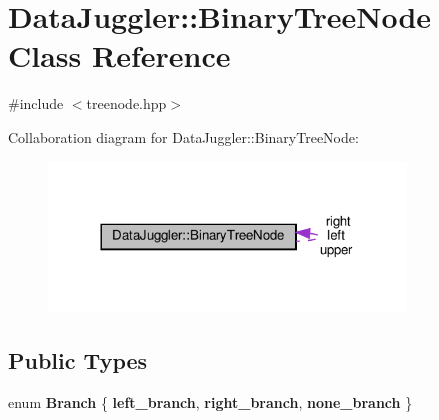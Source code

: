 \hypertarget{classDataJuggler_1_1BinaryTreeNode}{}\section{Data\+Juggler\+:\+:Binary\+Tree\+Node Class Reference}
\label{classDataJuggler_1_1BinaryTreeNode}


{\ttfamily \#include $<$treenode.\+hpp$>$}



Collaboration diagram for Data\+Juggler\+:\+:Binary\+Tree\+Node\+:\nopagebreak
\begin{figure}[H]
\begin{center}
\leavevmode
\includegraphics[width=269pt]{classDataJuggler_1_1BinaryTreeNode__coll__graph}
\end{center}
\end{figure}
\subsection*{Public Types}
\begin{DoxyCompactItemize}
\item 
\mbox{\label{classDataJuggler_1_1BinaryTreeNode_a3fefd287cd17d15b5905296826eca754}} 
enum {\bfseries Branch} \{ {\bfseries left\+\_\+branch}, 
{\bfseries right\+\_\+branch}, 
{\bfseries none\+\_\+branch}
 \}
\end{DoxyCompactItemize}
